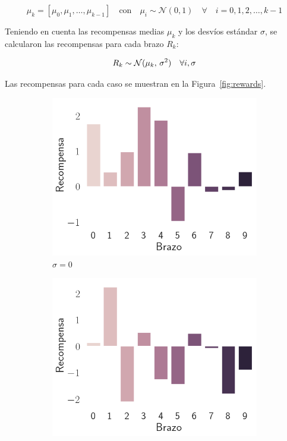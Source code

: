 \documentclass[12pt]{article}
\begin{document}
    \[
        \mu_k = \left[ \mu_{0}, \mu_{1}, \ldots, \mu_{k-1} \right] \quad \text{con} \quad \mu_{i} \sim \mathcal{N}(0, 1) \quad \forall \quad i = 0, 1, 2, \ldots, k-1
    \]

    Teniendo en cuenta las recompensas medias $\mu_{k}$ y los desvíos estándar $\sigma$, se calcularon las recompensas para cada brazo $R_{k}$:

    \[
        R_k \sim \mathcal{N}(\mu_k,\,\sigma^{2}) \quad \forall i,\sigma \\
    \]

    Las recompensas para cada caso se muestran en la Figura~\ref{fig:rewards}.

    \begin{figure}[H]
        \centering
        \begin{subfigure}[H]{0.3\textwidth}
            \includegraphics[width=\textwidth]{../img/rewards_sigma_0}
            \caption{$\sigma=0$}
            \label{fig:rewards_0}
        \end{subfigure}
        \begin{subfigure}[H]{0.3\textwidth}
            \includegraphics[width=\textwidth]{../img/rewards_sigma_1}

\end{subfigure}
\end{figure}
\end{document}

